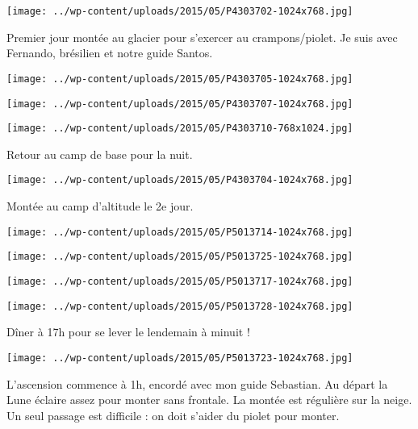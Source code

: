 \centerline{\texttt{[image: ../wp-content/uploads/2015/05/P4303702-1024x768.jpg]} } 
 \newline
 Premier jour montée au glacier pour s'exercer au crampons/piolet. Je suis avec Fernando, brésilien et notre guide Santos. \newline
 \newline
\centerline{\texttt{[image: ../wp-content/uploads/2015/05/P4303705-1024x768.jpg]} } 
 \newline
 \newline
\centerline{\texttt{[image: ../wp-content/uploads/2015/05/P4303707-1024x768.jpg]} } 
 \newline
 \newline
\centerline{\texttt{[image: ../wp-content/uploads/2015/05/P4303710-768x1024.jpg]} } 
 \newline
 Retour au camp de base pour la nuit. \newline
 \newline
\centerline{\texttt{[image: ../wp-content/uploads/2015/05/P4303704-1024x768.jpg]} } 
 \newline
 Montée au camp d'altitude le 2e jour. \newline
 \newline
\centerline{\texttt{[image: ../wp-content/uploads/2015/05/P5013714-1024x768.jpg]} } 
 \newline
 \newline
\centerline{\texttt{[image: ../wp-content/uploads/2015/05/P5013725-1024x768.jpg]} } 
 \newline
 \newline
\centerline{\texttt{[image: ../wp-content/uploads/2015/05/P5013717-1024x768.jpg]} } 
 \newline
 \newline
\centerline{\texttt{[image: ../wp-content/uploads/2015/05/P5013728-1024x768.jpg]} } 
 \newline
 Dîner à 17h pour se lever le lendemain à minuit ! \newline
 \newline
\centerline{\texttt{[image: ../wp-content/uploads/2015/05/P5013723-1024x768.jpg]} } 
 \newline
 L'ascension commence à 1h, encordé avec mon guide Sebastian. \newline
 Au départ la Lune éclaire assez pour monter sans frontale. La montée est régulière sur la neige. Un seul passage est difficile : on doit s'aider du piolet pour monter. \newline
